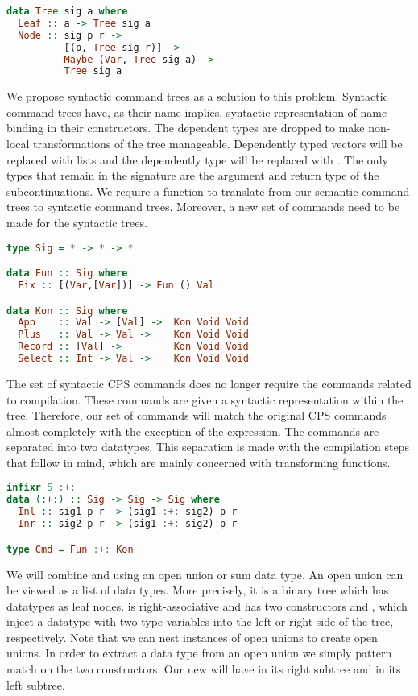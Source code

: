 \begin{lstlisting}[language=Haskell]
data Tree sig a where
  Leaf :: a -> Tree sig a
  Node :: sig p r ->
          [(p, Tree sig r)] ->
          Maybe (Var, Tree sig a) ->
          Tree sig a
\end{lstlisting}

We propose syntactic command trees as a solution to this problem. Syntactic command trees have, as their name implies, syntactic representation of name binding in their constructors. The dependent types are dropped to make non-local transformations of the tree manageable. Dependently typed vectors will be replaced with lists and the dependently type  will be replaced with . The only types that remain in the signature are the argument  and return type  of the subcontinuations. We require a function to translate from our semantic command trees to syntactic command trees. Moreover, a new set of commands need to be made for the syntactic trees.

\begin{lstlisting}[language=Haskell]
type Sig = * -> * -> *

data Fun :: Sig where
  Fix :: [(Var,[Var])] -> Fun () Val

data Kon :: Sig where
  App    :: Val -> [Val] ->  Kon Void Void
  Plus   :: Val -> Val ->    Kon Void Void
  Record :: [Val] ->         Kon Void Void
  Select :: Int -> Val ->    Kon Void Void
\end{lstlisting}

The set of syntactic \ac{CPS} commands does no longer require the commands related to compilation. These commands are given a syntactic representation within the tree. Therefore, our set of commands will match the original \ac{CPS} commands almost completely with the exception of the  expression. The commands are separated into two datatypes. This separation is made with the compilation steps that follow in mind, which are mainly concerned with transforming functions.

\begin{lstlisting}[language=Haskell]
infixr 5 :+:
data (:+:) :: Sig -> Sig -> Sig where
  Inl :: sig1 p r -> (sig1 :+: sig2) p r
  Inr :: sig2 p r -> (sig1 :+: sig2) p r

type Cmd = Fun :+: Kon
\end{lstlisting}

We will combine  and  using an open union or sum data type. An open union can be viewed as a list of data types. More precisely, it is a binary tree which has datatypes as leaf nodes. \icode{:+:} is right-associative and has two constructors  and , which inject a datatype with two type variables into the left or right side of the tree, respectively. Note that we can nest instances of open unions to create open unions. In order to extract a data type from an open union we simply pattern match on the two constructors. Our new  will have  in its right subtree and  in its left subtree.

